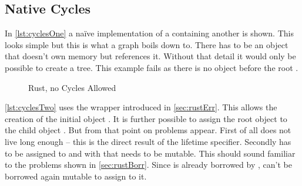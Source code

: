 \documentclass[thesis]{subfiles}
\begin{document}
  \subsection{Native Cycles}
    In \autoref{lst:cyclesOne} a na\"ive implementation of a \Node containing another \Node is shown.
    This looks simple but this is what a graph boils down to.
    There has to be an object that doesn't own memory but references it.
    Without that detail it would only be possible to create a tree.
    This example fails as there is no \Node object before the root \Node {}.

    \newsavebox{\cyclesOne}
    \begin{lrbox}{\cyclesOne}%
      \begin{minipage}{.45\linewidth}
        
      \end{minipage}
    \end{lrbox}

    \newsavebox{\cyclesTwo}
    \begin{lrbox}{\cyclesTwo}
      \begin{minipage}{.475\linewidth}
        
      \end{minipage}
    \end{lrbox}

    \begin{figure}[ht]
      \captionsetup{type=lstlisting}
       \hfill%
      \caption{Rust, no Cycles Allowed}\label{lst:cycles}
    \end{figure}

    \autoref{lst:cyclesTwo} uses the  wrapper introduced in \autoref{sec:rustErr}.
    This allows the creation of the initial \Node object .
    It is further possible to assign the root object  to the child object .
    But from that point on problems appear.
    First of all does  not live long enough -- this is the direct result of the lifetime specifier.
    Secondly has  to be assigned to  and with that needs  to be mutable.
    This should sound familiar to the problems shown in \autoref{sec:rustBorr}.
    Since  is already borrowed by ,  can't be borrowed again mutable to assign  to it.
\end{document}
